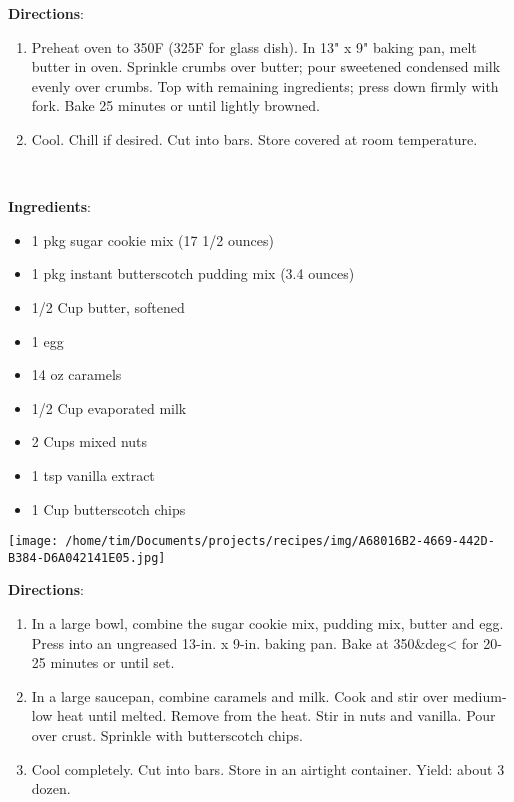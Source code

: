 \documentclass[11pt, twoside, openany]{book}
\begin{document}
\textbf{Directions}:
\vspace{-3mm}\begin{enumerate}\setlength\itemsep{-1mm}
\item Preheat oven to 350F (325F for glass dish). In 13" x 9" baking pan, melt butter in oven. Sprinkle crumbs over butter; pour sweetened condensed milk evenly over crumbs. Top with remaining ingredients; press down firmly with fork. Bake 25 minutes or until lightly browned.
\item Cool. Chill if desired. Cut into bars. Store covered at room temperature.
\end{enumerate}
 \label{gooey-butterscotch-bars-recipe}\hfill\textit{}\\
\begin{minipage}[t]{0.8\linewidth}
\textbf{Ingredients}:\vspace{-3mm}
\begin{multicols}{2}
\begin{itemize}\setlength\itemsep{-1mm}
\item 1 pkg sugar cookie mix (17 1/2 ounces)
\item 1 pkg instant butterscotch pudding mix (3.4 ounces)
\item 1/2 Cup butter, softened
\item 1 egg
\item 14 oz caramels
\item 1/2 Cup evaporated milk
\item 2 Cups mixed nuts
\item 1 tsp vanilla extract
\item 1 Cup butterscotch chips
\end{itemize}
\end{multicols}
\end{minipage}
\begin{minipage}[t]{0.2\linewidth}
\centering \strut\vspace*{-\baselineskip}\newline
\texttt{[image: /home/tim/Documents/projects/recipes/img/A68016B2-4669-442D-B384-D6A042141E05.jpg]}\\
\end{minipage}\vspace{3mm}
\textbf{Directions}:
\vspace{-3mm}\begin{enumerate}\setlength\itemsep{-1mm}
\item In a large bowl, combine the sugar cookie mix, pudding mix, butter and egg. Press into an ungreased 13-in. x 9-in. baking pan. Bake at 350&deg< for 20-25 minutes or until set. 
\item  In a large saucepan, combine caramels and milk. Cook and stir over medium-low heat until melted. Remove from the heat. Stir in nuts and vanilla. Pour over crust. Sprinkle with butterscotch chips. 
\item  Cool completely. Cut into bars. Store in an airtight container. Yield: about 3 dozen.
\end{enumerate}
\end{document}
